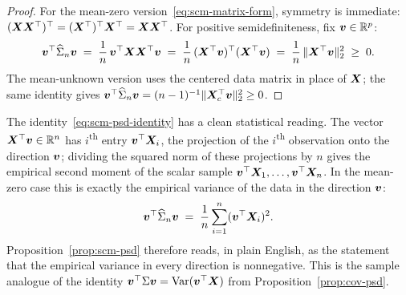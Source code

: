 \begin{proof}
For the mean-zero version~\eqref{eq:scm-matrix-form}, symmetry is immediate: \((\bm{X} \bm{X}^{\top})^{\top} = (\bm{X}^{\top})^{\top} \bm{X}^{\top} = \bm{X} \bm{X}^{\top}\). For positive semidefiniteness, fix \(\bm{v} \in \mathbb{R}^p\):
\begin{equation}
  \bm{v}^{\top} \widehat{\Sigma}_n \bm{v}
  \;=\; \frac{1}{n}\, \bm{v}^{\top} \bm{X} \bm{X}^{\top} \bm{v}
  \;=\; \frac{1}{n}\, (\bm{X}^{\top} \bm{v})^{\top} (\bm{X}^{\top} \bm{v})
  \;=\; \frac{1}{n}\, \lVert\bm{X}^{\top} \bm{v}\rVert_2^2
  \;\ge\; 0.
  \label{eq:scm-psd-identity}
\end{equation}
The mean-unknown version uses the centered data matrix in place of \(\bm{X}\); the same identity gives \(\bm{v}^{\top} \widehat{\Sigma}_n \bm{v} = (n - 1)^{-1} \lVert\bm{X}_c^{\top} \bm{v}\rVert_2^2 \ge 0\).
\end{proof}

The identity~\eqref{eq:scm-psd-identity} has a clean statistical reading. The vector \(\bm{X}^{\top} \bm{v} \in \mathbb{R}^n\) has \(i\)\textsuperscript{th} entry \(\bm{v}^{\top} \bm{X}_i\), the projection of the \(i\)\textsuperscript{th} observation onto the direction \(\bm{v}\); dividing the squared norm of these projections by \(n\) gives the empirical second moment of the scalar sample \(\bm{v}^{\top} \bm{X}_1, \ldots, \bm{v}^{\top} \bm{X}_n\). In the mean-zero case this is exactly the empirical variance of the data in the direction \(\bm{v}\):
\begin{equation}
  \bm{v}^{\top} \widehat{\Sigma}_n \bm{v} \;=\; \frac{1}{n} \sum_{i = 1}^n (\bm{v}^{\top} \bm{X}_i)^2.
  \label{eq:scm-empirical-var}
\end{equation}
Proposition~\ref{prop:scm-psd} therefore reads, in plain English, as the statement that the empirical variance in every direction is nonnegative. This is the sample analogue of the identity \(\bm{v}^{\top} \Sigma \bm{v} = \operatorname{Var}(\bm{v}^{\top} \bm{X})\) from Proposition~\ref{prop:cov-psd}.


